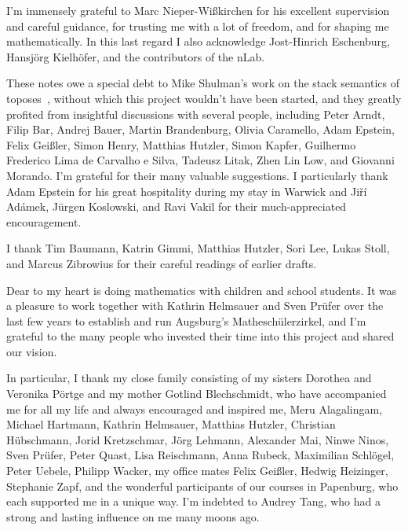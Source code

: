 \documentclass[10pt,reqno,a4paper]{amsbook}
\theoremstyle{definition}
\theoremstyle{plain}
\theoremstyle{remark}
\newcommand{\?}{\,{:}\,}
\renewcommand{\_}{\mathpunct{.}\,}
\begin{document}
{I'm immensely grateful to Marc Nieper-Wißkirchen for his excellent supervision and
careful guidance, for trusting me with a lot of freedom, and for shaping me
mathematically. In this last regard I also acknowledge Jost-Hinrich Eschenburg,
Hansjörg Kielhöfer, and the contributors of the nLab.

These notes owe a special debt to Mike Shulman's work on the stack semantics of
toposes~\cite{shulman:stack}, without which this project wouldn't have been
started, and they greatly profited from insightful discussions with several people,
including Peter Arndt, Filip Bar, Andrej Bauer, Martin Brandenburg, Olivia
Caramello, Adam Epstein, Felix Geißler, Simon Henry, Matthias Hutzler, Simon
Kapfer, Guilhermo Frederico Lima de Carvalho e Silva, Tadeusz Litak, Zhen Lin
Low, and Giovanni Morando. I'm grateful for their many valuable suggestions. I
particularly thank Adam Epstein for his great hospitality during my stay in
Warwick and Jiří Adámek, Jürgen Koslowski, and Ravi Vakil for their
much-appreciated encouragement.

I thank Tim Baumann, Katrin Gimmi, Matthias Hutzler, Sori Lee, Lukas Stoll, and Marcus Zibrowius for their
careful readings of earlier drafts.

Dear to my heart is doing mathematics with children and school students. It was
a pleasure to work together with Kathrin Helmsauer and Sven Prüfer over the
last few years to establish and run Augsburg's Matheschülerzirkel, and I'm
grateful to the many people who invested their time into this project and shared our
vision.

In particular, I thank my close family consisting of my sisters Dorothea and
Veronika Pörtge and my mother Gotlind Blechschmidt, who have accompanied me for
all my life and always encouraged and inspired me, Meru Alagalingam,
Michael Hartmann, Kathrin Helmsauer, Matthias Hutzler,
Christian Hübschmann, Jorid Kretzschmar, Jörg Lehmann, Alex\-an\-der Mai, Ninwe
Ninos, Sven Prüfer, Peter Quast, Lisa Reisch\-mann, Anna Rubeck, Ma\-xi\-mi\-li\-an
Schlögel, Peter Uebele, Philipp Wacker, my office mates Felix Geißler, Hedwig Heizinger,
Stephanie Zapf, and the wonderful participants of our courses in Papenburg, who
each supported me in a unique way. I'm indebted to Audrey Tang, who had a
strong and lasting influence on me many moons ago.

}
\end{document}
